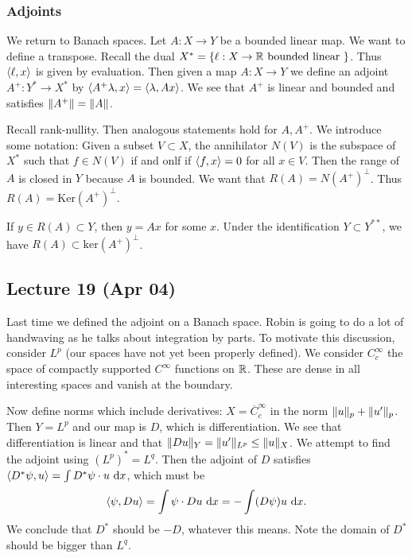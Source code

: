 \documentclass[10pt, twoside]{article}
\renewcommand{\d}{\ \mathrm{d}}
\begin{document}
    \subsubsection{Adjoints} We return to Banach spaces. Let $A:X \to Y$ be a
    bounded linear map. We want to define a transpose. Recall the dual $X^* =
    \{\ell:X \to \mathbb{R} \text{ bounded linear } \}$. Thus $\langle\ell,x\rangle$ is given
    by evaluation. Then given a map $A:X \to Y$ we define an adjoint $A^+: Y^*
    \to X^*$ by $\langle A^+ \lambda,x\rangle = \langle\lambda, Ax\rangle$. We see that $A^+$ is
    linear and bounded and satisfies $\lVert A^+\rVert = \lVert A\rVert$.

    Recall rank-nullity. Then analogous statements hold for $A,A^+$. We
    introduce some notation: Given a subset $V \subset X$, the annihilator
    $N(V)$ is the subspace of $X^*$ such that $f \in N(V)$ if and onlf if
    $\langle f,x\rangle = 0$ for all $x \in V$. Then the range of $A$ is closed in $Y$
    because $A$ is bounded. We want that $R(A) = N(A^+)^{\perp}$. Thus $R(A) =
    \mathrm{Ker}(A^+)^{\perp}$.
        
    If $y \in R(A) \subset Y$, then $y=Ax$ for some $x$. Under the
    identification $Y \subset Y^{**}$, we have $R(A) \subset
    \mathrm{ker}(A^+)^{\perp}$.

    \subsection{Lecture 19 (Apr 04)} Last time we defined the adjoint on a
    Banach space. Robin is going to do a lot of handwaving as he talks about
    integration by parts. To motivate this discussion, consider $L^p$ (our
    spaces have not yet been properly defined). We consider $C_c^{\infty}$ the
    space of compactly supported $C^{\infty}$ functions on $\mathbb{R}$. These are
    dense in all interesting spaces and vanish at the boundary.

    Now define norms which include derivatives: $X = \overline{C}_c^{\infty}$
    in the norm $\lVert u\rVert_p + \lVert u'\rVert_p$. Then $Y = L^p$ and our map is $D$,
    which is differentiation. We see that differentiation is linear and that
    $\lVert Du\rVert_Y = \lVert u'\rVert_{L^p} \leq \lVert u\rVert_X$. We attempt to find the
    adjoint using $(L^p)^* = L^q$. Then the adjoint of $D$ satisfies $\gen{D^*
    \psi, u} = \int D^* \psi \cdot u \d x$, which must be \[\gen{\psi, Du} =
    \int \psi \cdot Du \d x = - \int (D \psi) u \d x.\] We conclude that $D^*$
    should be $-D$, whatever this means. Note the domain of $D^*$ should be
    bigger than $L^q$. 
\end{document}
